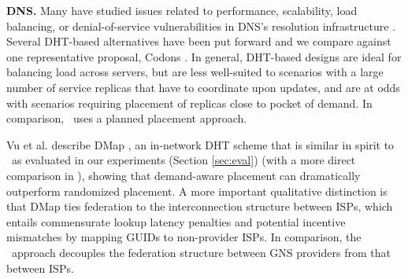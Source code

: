 
{\bf{DNS.}} Many have studied issues related to performance, scalability, load balancing, or denial-of-service vulnerabilities in DNS's resolution infrastructure \cite{Pappas,codons-paper,Brownlee,dnssec}. Several DHT-based alternatives have been put forward \cite{codons-paper,cox,DHTdns} and we compare against one representative proposal, Codons \cite{codons-paper}. In general, DHT-based designs are ideal for balancing load across servers, but are less well-suited to scenarios with a large number of service replicas that have to coordinate upon updates, and are at odds with scenarios requiring placement of replicas close to pocket of demand. In comparison, \auspice\ uses a planned placement approach.

Vu et al. describe DMap \cite{VuICDCS12}, an in-network DHT scheme %
that is similar in spirit to \staticthree\ as evaluated in our experiments (Section \ref{sec:eval}) (with a more direct comparison in \cite{techreport}), showing that demand-aware placement can dramatically outperform randomized placement. A more important qualitative distinction is that DMap ties federation to the interconnection structure between ISPs, which entails commensurate lookup latency penalties and potential incentive mismatches by mapping GUIDs to non-provider ISPs. In comparison, the \auspice\ approach decouples the federation structure between GNS providers from that between ISPs.


